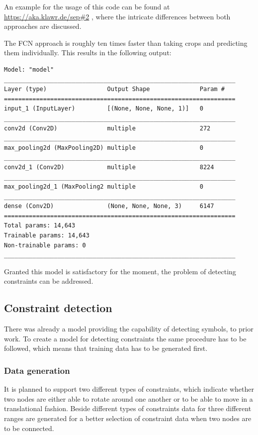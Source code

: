 An example for the usage of this code can be found at \url{https://aka.klawr.de/sep#2} %
, where the intricate differences between both approaches are discussed.

The FCN approach is roughly ten times faster than taking crops and predicting them individually. 
This  results in the following output:

\begin{lstlisting}
Model: "model"
_________________________________________________________________
Layer (type)                 Output Shape              Param #   
=================================================================
input_1 (InputLayer)         [(None, None, None, 1)]   0         
_________________________________________________________________
conv2d (Conv2D)              multiple                  272       
_________________________________________________________________
max_pooling2d (MaxPooling2D) multiple                  0         
_________________________________________________________________
conv2d_1 (Conv2D)            multiple                  8224      
_________________________________________________________________
max_pooling2d_1 (MaxPooling2 multiple                  0         
_________________________________________________________________
dense (Conv2D)               (None, None, None, 3)     6147      
=================================================================
Total params: 14,643
Trainable params: 14,643
Non-trainable params: 0
_________________________________________________________________
\end{lstlisting}

Granted this model is satisfactory for the moment, the problem of detecting constraints can be addressed.

\subsection{Constraint detection}

There was already a model providing the capability of detecting symbols, to prior work.
To create a model for detecting constraints the same procedure has to be followed, which means that training data has to be generated first.

\subsubsection{Data generation}

It is planned to support two different types of constraints, which indicate whether two nodes are either able to rotate around one another or to be able to move in a translational fashion.
Beside different types of constraints data for three different ranges are generated for a better selection of constraint data when two nodes are to be connected.

